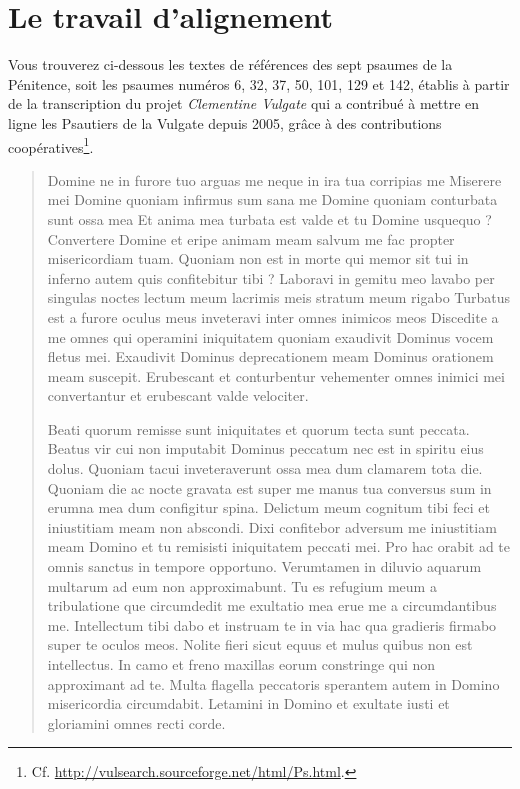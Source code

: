 \documentclass[a4paper,12pt,twoside]{book}
\begin{document}
	\section{\label{alignement}Le travail d'alignement}
	
	Vous trouverez ci-dessous les textes de références des sept psaumes de la Pénitence, soit les psaumes numéros 6, 32, 37, 50, 101, 129 et 142, établis à partir de la transcription du projet \og \textit{Clementine Vulgate}\fg{} qui a contribué à mettre en ligne les Psautiers de la Vulgate depuis 2005, grâce à des contributions coopératives\footnote{Cf. \url{http://vulsearch.sourceforge.net/html/Ps.html}.}.
	
	\begin{quotation}
	Domine ne in furore tuo arguas me neque in ira tua corripias me
Miserere mei Domine quoniam infirmus sum sana me Domine quoniam conturbata sunt ossa mea
Et anima mea turbata est valde et tu Domine usquequo ?
Convertere Domine et eripe animam meam salvum me fac propter misericordiam tuam. 
Quoniam non est in morte qui memor sit tui in inferno autem quis confitebitur tibi ? 
Laboravi in gemitu meo lavabo per singulas noctes lectum meum lacrimis meis stratum meum rigabo
Turbatus est a furore oculus meus inveteravi inter omnes inimicos meos
Discedite a me omnes qui operamini iniquitatem quoniam exaudivit Dominus vocem fletus mei.
Exaudivit Dominus deprecationem meam Dominus orationem meam suscepit. 
Erubescant et conturbentur vehementer omnes inimici mei convertantur et erubescant valde velociter.

Beati quorum remisse sunt iniquitates et quorum tecta sunt peccata.
Beatus vir cui non imputabit Dominus peccatum nec est in spiritu eius dolus.
Quoniam tacui inveteraverunt ossa mea dum clamarem tota die.
Quoniam die ac nocte gravata est super me manus tua conversus sum in erumna mea dum configitur spina.
Delictum meum cognitum tibi feci et iniustitiam meam non abscondi.
Dixi confitebor adversum me iniustitiam meam Domino et tu remisisti iniquitatem peccati mei.
Pro hac orabit ad te omnis sanctus in tempore opportuno.
Verumtamen in diluvio aquarum multarum ad eum non approximabunt.
Tu es refugium meum a tribulatione que circumdedit me exultatio mea erue me a circumdantibus me.
Intellectum tibi dabo et instruam te in via hac qua gradieris firmabo super te oculos meos.
Nolite fieri sicut equus et mulus quibus non est intellectus.
In camo et freno maxillas eorum constringe qui non approximant ad te.
Multa flagella peccatoris sperantem autem in Domino misericordia circumdabit.
Letamini in Domino et exultate iusti et gloriamini omnes recti corde.


\end{quotation}
\end{document}
